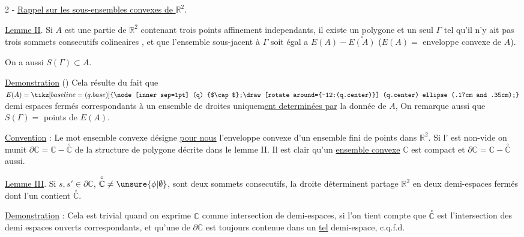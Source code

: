 2 - \uline{Rappel sur les sous-ensembles convexes de $\mathbb{R}^{2}$}.

\margin{!}\uline{Lemme II}. Si $A$ est une partie  de $\mathbb{R}^{2}$ contenant trois points affinement independants, il existe un polygone et un seul $\Gamma$ tel qu'il n'y ait pas trois sommets consecutifs colineaires , et  que l'ensemble sous-jacent à $\Gamma$ soit égal a $E(A)-\overset{\circ}{E(A)}$ ($E(A)=$ enveloppe convexe de $A$).

On a aussi $S(\Gamma)\subset A$.

%
\uline{Demonstration} () Cela résulte du fait que $E(A)=\tikz[baseline=(q.base)]{\node[inner sep=1pt] (q) {$\cap$};\draw[rotate around={-12:(q.center)}] (q.center) ellipse (.17cm and .35cm);}$ demi espaces fermés correspondants à un ensemble de droites uniquem\uline{ent determinées par} la donnée de $A$, On remarque aussi que $S(\Gamma)=$  points  de $E(A)$.

%
\uline{Convention} : Le mot ensemble convexe désigne \uline{pour nous} l'enveloppe convexe d'un ensemble fini de points dans $\mathbb{R}^{2}$.  Si l' est non-vide on munit $\partial\mathbb{C}=\mathbb{C}-\overset{\circ}{\mathbb{C}}$ de la structure de polygone décrite dans le lemme II. Il est clair qu'un \uline{ensemble convexe} $\mathbb{C}$ est compact et  $\partial\mathbb{C}=\mathbb{C}-\overset{\circ}{\mathbb{C}}$ aussi.

\uline{Lemme III}. Si $s,s'\in\partial\mathbb{C}$, $\overset{\circ}{\mathbb{C}}\ne\unsure{\phi|\emptyset}$, sont deux sommets consecutifs, la droite   déterminent partage $\mathbb{R}^{2}$ en deux demi-espaces fermés dont l'un contient $\overset{\circ}{\mathbb{C}}$.

%
\uline{Demonstration} : Cela est trivial quand on exprime $\mathbb{C}$ comme intersection de demi-espaces, si l'on tient compte que $\overset{\circ}{\mathbb{C}}$ est l'intersection des demi espaces ouverts correspondants, et qu'une  de $\partial\mathbb{C}$ est toujours contenue dans un \uline{tel} demi-espace, c.q.f.d.

